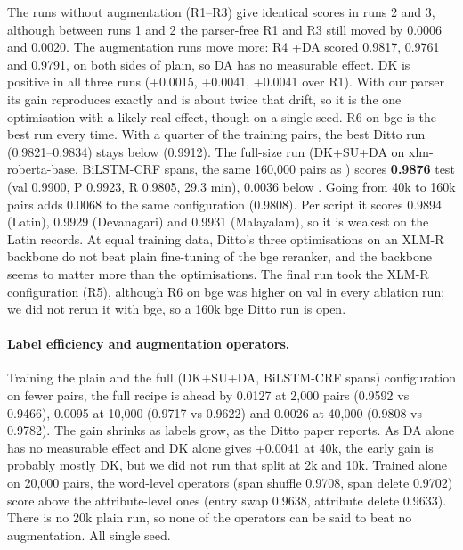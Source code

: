 The runs without augmentation (R1--R3) give identical scores in runs 2 and 3, although between runs 1
and 2 the parser-free R1 and R3 still moved by 0.0006 and 0.0020. The augmentation runs move more: R4 +DA
scored 0.9817, 0.9761 and 0.9791, on both sides of plain, so DA has no measurable effect. DK is positive in
all three runs (+0.0015, +0.0041, +0.0041 over R1). With our parser its gain reproduces exactly and is
about twice that drift, so it is the one optimisation with a likely real effect, though on a single seed.
R6 on bge is the best run every time.
With a quarter of the training pairs, the best Ditto run
(0.9821--0.9834) stays below  (0.9912). The full-size run (DK+SU+DA on xlm-roberta-base, BiLSTM-CRF spans, the
same 160,000 pairs as ) scores \textbf{0.9876} test \fhalf{} (val 0.9900, P 0.9923, R 0.9805, 29.3 min), 0.0036
below . Going from 40k to 160k pairs adds 0.0068 to the same configuration (0.9808). Per script it scores
0.9894 (Latin), 0.9929 (Devanagari) and 0.9931 (Malayalam), so it is weakest on the Latin records. At equal training
data, Ditto's three optimisations on an XLM-R backbone do not beat plain fine-tuning of the bge reranker, and the
backbone seems to matter more than the optimisations. The final run took the XLM-R configuration (R5), although R6 on
bge was higher on val in every ablation run; we did not rerun it with bge, so a 160k bge Ditto run is open.

\paragraph{Label efficiency and augmentation operators.} Training the plain and the full (DK+SU+DA, BiLSTM-CRF
spans) configuration on fewer pairs, the full recipe is ahead by 0.0127 at 2,000 pairs (0.9592 vs 0.9466), 0.0095
at 10,000 (0.9717 vs 0.9622) and 0.0026 at 40,000 (0.9808 vs 0.9782). The gain shrinks as labels grow, as the Ditto paper
reports. As DA alone has no measurable effect and DK alone gives +0.0041 at 40k, the early gain is probably mostly DK, but
we did not run that split at 2k and 10k. Trained alone on 20,000 pairs, the word-level operators (span shuffle 0.9708, span
delete 0.9702) score above the attribute-level ones (entry swap 0.9638, attribute delete 0.9633). There is no 20k plain run, so
none of the operators can be said to beat no augmentation. All single seed.
